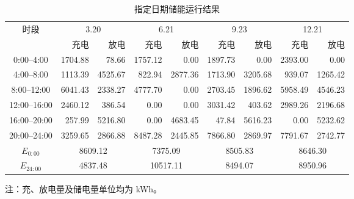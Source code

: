 \documentclass[zihao=-4,a4paper,UTF8,fontset=none]{ctexart}
\begin{document}
\begin{table}[H]
    \centering
    \caption{指定日期储能运行结果}
    \label{tab:q2_storage}
    \scriptsize
    \setlength{\tabcolsep}{2.8pt}
    \renewcommand{\arraystretch}{0.88}
    \begin{tabular}{c*{8}{r}}
        \toprule
        \multirow{2}{*}{时段}
        & \multicolumn{2}{c}{3.20}
        & \multicolumn{2}{c}{6.21}
        & \multicolumn{2}{c}{9.23}
        & \multicolumn{2}{c}{12.21} \\
        \cmidrule(lr){2-3}
        \cmidrule(lr){4-5}
        \cmidrule(lr){6-7}
        \cmidrule(lr){8-9}
        & 充电 & 放电 & 充电 & 放电 & 充电 & 放电 & 充电 & 放电 \\
        \midrule
        0:00--4:00
        & 1704.88 & 78.66
        & 1757.12 & 0.00
        & 1897.73 & 0.00
        & 2393.00 & 0.00 \\

        4:00--8:00
        & 1113.39 & 4525.67
        & 822.94 & 2877.36
        & 1713.90 & 3205.68
        & 939.07 & 1265.42 \\

        8:00--12:00
        & 6041.43 & 2338.27
        & 4777.70 & 0.00
        & 2703.45 & 1896.62
        & 5958.49 & 4546.23 \\

        12:00--16:00
        & 2460.12 & 386.54
        & 0.00 & 0.00
        & 3031.42 & 403.62
        & 2989.26 & 2196.68 \\

        16:00--20:00
        & 257.99 & 5216.80
        & 0.00 & 4683.45
        & 47.84 & 5616.23
        & 0.00 & 5232.62 \\

        20:00--24:00
        & 3259.65 & 2866.88
        & 8487.28 & 2445.85
        & 7866.80 & 2869.97
        & 7791.67 & 2742.77 \\
        \midrule
        $E_{0:00}$
        & \multicolumn{2}{c}{8609.12}
        & \multicolumn{2}{c}{7375.09}
        & \multicolumn{2}{c}{8505.83}
        & \multicolumn{2}{c}{8646.30} \\

        $E_{24:00}$
        & \multicolumn{2}{c}{4837.48}
        & \multicolumn{2}{c}{10517.11}
        & \multicolumn{2}{c}{8494.07}
        & \multicolumn{2}{c}{8950.96} \\
        \bottomrule
    \end{tabular}

    {\scriptsize 注：充、放电量及储电量单位均为 kWh。}
\end{table}
\end{document}
